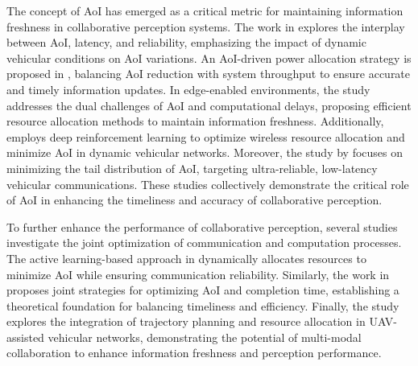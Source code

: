 The concept of AoI has emerged as a critical metric for maintaining information freshness in collaborative perception systems. The work in  \cite{9903381} explores the interplay between AoI, latency, and reliability, emphasizing the impact of dynamic vehicular conditions on AoI variations. An AoI-driven power allocation strategy is proposed in \cite{10081395}, balancing AoI reduction with system throughput to ensure accurate and timely information updates. In edge-enabled environments, the study \cite{9599398} addresses the dual challenges of AoI and computational delays, proposing efficient resource allocation methods to maintain information freshness. Additionally, \cite{8954939} employs deep reinforcement learning to optimize wireless resource allocation and minimize AoI in dynamic vehicular networks.  Moreover, the study by \cite{8937801} focuses on minimizing the tail distribution of AoI, targeting ultra-reliable, low-latency vehicular communications. These studies collectively demonstrate the critical role of AoI in enhancing the timeliness and accuracy of collaborative perception.


To further enhance the performance of collaborative perception, several studies investigate the joint optimization of communication and computation processes. The active learning-based approach in \cite{8918241} dynamically allocates resources to minimize AoI while ensuring communication reliability. Similarly, the work in \cite{9023385} proposes joint strategies for optimizing AoI and completion time, establishing a theoretical foundation for balancing timeliness and efficiency. Finally, the study \cite{10130737} explores the integration of trajectory planning and resource allocation in UAV-assisted vehicular networks, demonstrating the potential of multi-modal collaboration to enhance information freshness and perception performance.